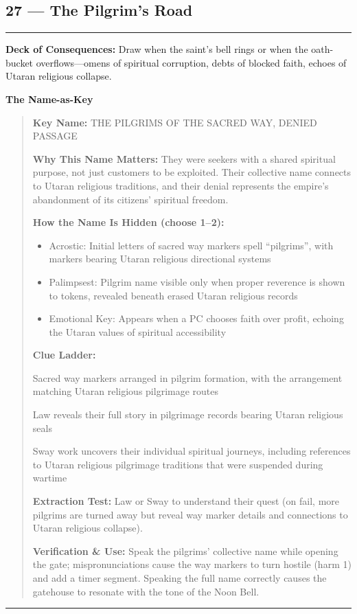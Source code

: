 \documentclass[18pt, letterpaper, twoside]{article}
\newenvironment{floorbox}[1]{%
    \begin{center}
    \begin{minipage}{0.95\textwidth}
    \subsection*{#1}
    \vspace{-0.5em}
    \rule{\textwidth}{0.5pt}
    \vspace{0.5em}
}{%
    \vspace{0.5em}
    \rule{\textwidth}{0.5pt}
    \end{minipage}
    \end{center}
}
\newenvironment{gmnote}[1]{%
    \vspace{0.5em}
    \noindent\textbf{#1}
    \begin{quote}
}{%
    \end{quote}
    \vspace{0.5em}
}
\newcommand{\deckdraw}[1]{\noindent\textbf{Deck of Consequences:} #1\par}
\newcommand{\keyname}[1]{\noindent\textbf{Key Name:} #1\par}
\newcommand{\nameimportance}[1]{\noindent\textbf{Why This Name Matters:} #1\par}
\begin{document}
\begin{floorbox}{27 --- The Pilgrim's Road}
\deckdraw{Draw when the saint's bell rings or when the oath-bucket overflows---omens of spiritual corruption, debts of blocked faith, echoes of Utaran religious collapse.}

\begin{gmnote}{The Name-as-Key}
\keyname{THE PILGRIMS OF THE SACRED WAY, DENIED PASSAGE}
\nameimportance{They were seekers with a shared spiritual purpose, not just customers to be exploited. Their collective name connects to Utaran religious traditions, and their denial represents the empire's abandonment of its citizens' spiritual freedom.}

\textbf{How the Name Is Hidden (choose 1--2):}
\begin{itemize}[leftmargin=*]
    \item Acrostic: Initial letters of sacred way markers spell ``pilgrims'', with markers bearing Utaran religious directional systems
    \item Palimpsest: Pilgrim name visible only when proper reverence is shown to tokens, revealed beneath erased Utaran religious records
    \item Emotional Key: Appears when a PC chooses faith over profit, echoing the Utaran values of spiritual accessibility
\end{itemize}

\textbf{Clue Ladder:}
\begin{description}[leftmargin=*, style=unboxed]
    \item[Gentle Nudge:] Sacred way markers arranged in pilgrim formation, with the arrangement matching Utaran religious pilgrimage routes
    \item[Actionable Lead:] Law reveals their full story in pilgrimage records bearing Utaran religious seals
    \item[Aha! Proof:] Sway work uncovers their individual spiritual journeys, including references to Utaran religious pilgrimage traditions that were suspended during wartime
\end{description}

\textbf{Extraction Test:} Law or Sway to understand their quest (on fail, more pilgrims are turned away but reveal way marker details and connections to Utaran religious collapse).

\textbf{Verification \& Use:} Speak the pilgrims' collective name while opening the gate; mispronunciations cause the way markers to turn hostile (harm 1) and add a timer segment. Speaking the full name correctly causes the gatehouse to resonate with the tone of the Noon Bell.
\end{gmnote}


\end{floorbox}
\end{document}
